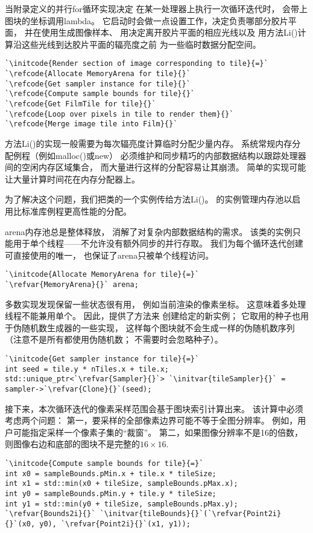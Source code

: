 当附录定义的并行{\ttfamily for}循环实现决定
在某一处理器上执行一次循环迭代时，
会带上图块的坐标调用lambda。
它启动时会做一点设置工作，决定负责哪部分胶片平面，
并在使用生成图像样本、
用决定离开胶片平面的相应光线以及
用方法{\ttfamily Li()}计算沿这些光线到达胶片平面的辐亮度之前
为一些临时数据分配空间。
\begin{lstlisting}
`\initcode{Render section of image corresponding to tile}{=}`
`\refcode{Allocate MemoryArena for tile}{}`
`\refcode{Get sampler instance for tile}{}`
`\refcode{Compute sample bounds for tile}{}`
`\refcode{Get FilmTile for tile}{}`
`\refcode{Loop over pixels in tile to render them}{}`
`\refcode{Merge image tile into Film}{}`
\end{lstlisting}

方法{\ttfamily Li()}的实现一般需要为每次辐亮度计算临时分配少量内存。
系统常规内存分配例程（例如{\ttfamily malloc()}或{\ttfamily new}）
必须维护和同步精巧的内部数据结构以跟踪处理器间的空闲内存区域集合，
而大量进行这样的分配容易让其崩溃。
简单的实现可能让大量计算时间花在内存分配器上。

为了解决这个问题，我们把类的一个实例传给方法{\ttfamily Li()}。
的实例管理内存池以启用比标准库例程更高性能的分配。

arena内存池总是整体释放，
消解了对复杂内部数据结构的需求。
该类的实例只能用于单个线程——不允许没有额外同步的并行存取。
我们为每个循环迭代创建可直接使用的唯一，
也保证了arena只被单个线程访问。
\begin{lstlisting}
`\initcode{Allocate MemoryArena for tile}{=}`
`\refvar{MemoryArena}{}` arena;
\end{lstlisting}

多数实现发现保留一些状态很有用，
例如当前渲染的像素坐标。
这意味着多处理线程不能兼用单个。
因此，提供了方法来
创建给定的新实例；
它取用的种子也用于伪随机数生成器的一些实现，
这样每个图块就不会生成一样的伪随机数序列
（注意不是所有都使用伪随机数；
不需要时会忽略种子）。
\begin{lstlisting}
`\initcode{Get sampler instance for tile}{=}`
int seed = tile.y * nTiles.x + tile.x;
std::unique_ptr<`\refvar{Sampler}{}`> `\initvar{tileSampler}{}` = sampler->`\refvar{Clone}{}`(seed);
\end{lstlisting}

接下来，本次循环迭代的像素采样范围会基于图块索引计算出来。
该计算中必须考虑两个问题：
第一，要采样的全部像素边界可能不等于全图分辨率。
例如，用户可能指定采样一个像素子集的“裁窗”。
第二，如果图像分辨率不是16的倍数，则图像右边和底部的图块不是完整的$16\times16$.
\begin{lstlisting}
`\initcode{Compute sample bounds for tile}{=}`
int x0 = sampleBounds.pMin.x + tile.x * tileSize;
int x1 = std::min(x0 + tileSize, sampleBounds.pMax.x);
int y0 = sampleBounds.pMin.y + tile.y * tileSize;
int y1 = std::min(y0 + tileSize, sampleBounds.pMax.y);
`\refvar{Bounds2i}{}` `\initvar{tileBounds}{}`(`\refvar{Point2i}{}`(x0, y0), `\refvar{Point2i}{}`(x1, y1));
\end{lstlisting}

